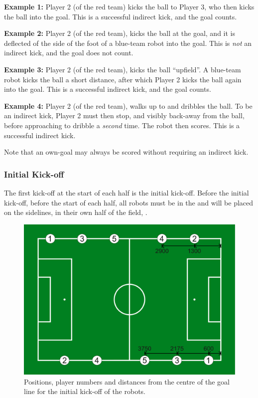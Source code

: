 \textbf{Example 1:} Player 2 (of the red team) kicks the ball to Player 3, who then kicks the ball into the goal. This is a successful indirect kick, and the goal counts.

\textbf{Example 2:} Player 2 (of the red team), kicks the ball at the goal, and it is deflected of the side of the foot of a blue-team robot into the goal. This is \textit{not} an indirect kick, and the goal does not count.

\textbf{Example 3:} Player 2 (of the red team), kicks the ball ``upfield''. A blue-team robot kicks the ball a short distance, after which Player 2 kicks the ball again into the goal. This is a successful indirect kick, and the goal counts.

\textbf{Example 4:} Player 2 (of the red team), walks up to and dribbles the ball. To be an indirect kick, Player 2 must then stop, and visibly back-away from the ball, before approaching to dribble a \textit{second} time. The robot then scores. This is a successful indirect kick.

Note that an own-goal may always be scored without requiring an indirect kick.

\subsubsection{Initial Kick-off}
\label{sec:initial-kick-off}

The first kick-off at the start of each half is the initial kick-off.
Before the initial kick-off, \ie before the start of each half, all robots must be in the  and will be placed on the sidelines, in their own half of the field, . 

\begin{figure}[t!]
	\begin{center}
		\leavevmode
		\includegraphics[width=1\columnwidth]{figs/initial_positions.pdf}
		\caption{Positions, player numbers and distances from the centre of the goal line for the initial kick-off of the robots.}
		\label{fig:initial_positions}
	\end{center}
\end{figure}


